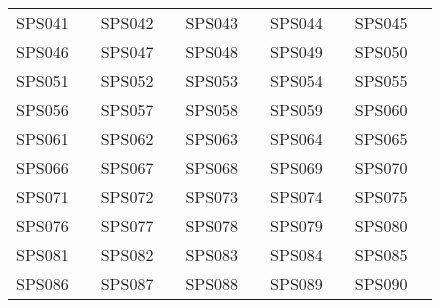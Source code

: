 \begin{table*}[ht]
\begin{tabular}{p{1.3cm}p{1.0cm}p{1.3cm}p{1.0cm}p{1.3cm}p{1.0cm}p{1.3cm}p{1.0cm}p{1.3cm}p{1.0cm}}
		SPS041      & \cite{Ejarque2022}         & SPS042      & \cite{10.1016/j.future.2022.01.024}         & SPS043      & \cite{Gibson2024}         & SPS044      & \cite{10.1145/3603166.3632142}         & SPS045      & \cite{Papadimitriou2021}         \\
		SPS046      & \cite{Krasovec2019}         & SPS047      & \cite{Mandal2013}         & SPS048      & \cite{Pavlovikj2014}         & SPS049      & \cite{McGough2018}         & SPS050      & \cite{Madduri2013}         \\
		SPS051      & \cite{Vockler2011}         & SPS052      & \cite{Maimour2004}         & SPS053      & \cite{10.1016/j.jpdc.2019.08.002}         & SPS054      & \cite{Shakil2018}         & SPS055      & \cite{Kupsch2010}         \\
		SPS056      & \cite{Viil2018}         & SPS057      & \cite{Zhang2014}         & SPS058      & \cite{10.1145/1851476.1851588}         & SPS059      & \cite{10.1145/3086567.3086570}         & SPS060      & \cite{Rood2009}         \\
		SPS061      & \cite{Mustafee2010}         & SPS062      & \cite{10.1145/2608029.2608035}         & SPS063      & \cite{10.1145/2465848.2465850}         & SPS064      & \cite{Thapa2018}         & SPS065      & \cite{Mateescu2011}         \\
		SPS066      & \cite{10.1016/j.jss.2016.05.027}         & SPS067      & \cite{10.1145/1383422.1383439}         & SPS068      & \cite{LePiane2024}         & SPS069      & \cite{10.1145/1362622.1362640}         & SPS070      & \cite{Pruyne1996}         \\
		SPS071      & \cite{Kepner2000}         & SPS072      & \cite{Maheshwari2012}         & SPS073      & \cite{Milligan2018}         & SPS074      & \cite{Fernandez-Quiruelas2015}         & SPS075      & \cite{Zhao2013}         \\
		SPS076      & \cite{Zhang2015a}         & SPS077      & \cite{Raicu2010}         & SPS078      & \cite{10.1145/1646468.1646478}         & SPS079      & \cite{Lopez2017}         & SPS080      & \cite{Freyermuth2021a}         \\
		SPS081      & \cite{Zhou2023}         & SPS082      & \cite{Chard2015}         & SPS083      & \cite{Babuji2019}         & SPS084      & \cite{Decker2022}         & SPS085      & \cite{Liu2022}         \\
		SPS086      & \cite{Walker2004}         & SPS087      & \cite{10.1145/2287076.2287105}         & SPS088      & \cite{Herzfeld2010}         & SPS089      & \cite{10.1145/1731740.1731843}         & SPS090      & \cite{Bockelman2021}         \\

\end{tabular}
\end{table*}

